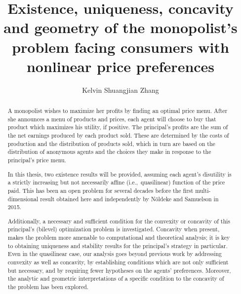 \documentclass{ut-thesis}[10pt]
\author{Kelvin Shuangjian Zhang}
\title{Existence, uniqueness, concavity and geometry of the monopolist's problem facing consumers with nonlinear price preferences}
\theoremstyle{plain}
\theoremstyle{definition}
\theoremstyle{remark}
\numberwithin{equation}{section}
\begin{document}
\begin{preliminary}

\maketitle

\cleardoublepage

\begin{abstract}

	A monopolist wishes to maximize her profits by finding an optimal price menu. After she announces a menu of products and prices, each agent will choose to buy that product which maximizes his utility, if positive. 
	The principal's profits are the sum of the net earnings produced by each product sold.  
	These are determined by the costs of production and the distribution of products sold, which in turn are based on the distribution of anonymous agents and
	the choices they make in response to the principal's price menu. \medskip 
	
	In this thesis, two existence results will be provided, assuming each agent's disutility is a strictly increasing but not necessarily affine (i.e.,\ quasilinear) function of the price paid. This has been an open problem for several decades before the first multi-dimensional result obtained here and independently by N\"oldeke and Samuelson in 2015.\medskip
	

	Additionally, a necessary and sufficient condition for the convexity or concavity of this principal's (bilevel) optimization problem is investigated. 
	Concavity when present, makes the problem more amenable to 
	computational and theoretical analysis;  it is key to obtaining uniqueness and stability results for the principal's strategy in particular.  Even in the quasilinear case, our analysis goes beyond previous work by addressing convexity as well as concavity,  by establishing conditions which are not only sufficient but necessary,  and by requiring fewer hypotheses on the agents' preferences.	Moreover, the analytic and geometric interpretations of a specific condition to the concavity of the problem has been explored.\medskip
	

\end{abstract}
\end{preliminary}
\end{document}
